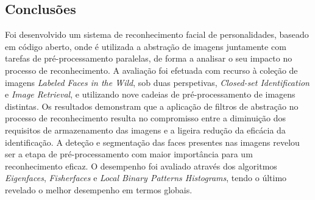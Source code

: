 \documentclass[9pt,a4paper]{extarticle}
\begin{document}
\begin{multicols}{2}
\section{Conclusões}\label{sec:conclusoes}
Foi desenvolvido um sistema de reconhecimento facial de personalidades, baseado em código aberto, onde é utilizada a abstração de imagens juntamente com tarefas de pré-processamento paralelas, de forma a analisar o seu impacto no processo de reconhecimento. A avaliação foi efetuada com recurso à coleção de imagens \textit{Labeled Faces in the Wild}, sob duas perspetivas, \textit{Closed-set Identification} e \textit{Image Retrieval}, e utilizando nove cadeias de pré-processamento de imagens distintas.
Os resultados demonstram que a aplicação de filtros de abstração no processo de reconhecimento resulta no compromisso entre a diminuição dos requisitos de armazenamento das imagens e a ligeira redução da eficácia da identificação. A deteção e segmentação das faces presentes nas imagens revelou ser a etapa de pré-processamento com maior importância para um reconhecimento eficaz. O desempenho foi avaliado através dos algoritmos \textit{Eigenfaces}, \textit{Fisherfaces} e \textit{Local Binary Patterns Histograms}, tendo o último revelado o melhor desempenho em termos globais.



\end{multicols}
\end{document}
